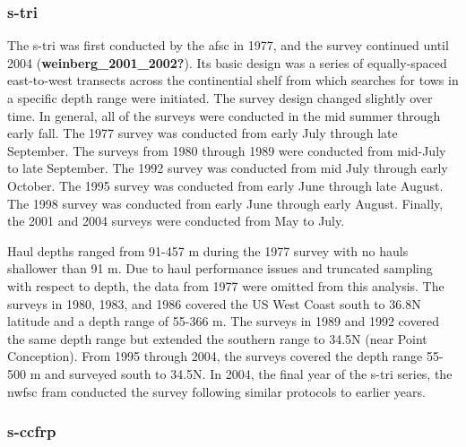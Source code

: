 \documentclass[11pt,
  english,
  a4paper,
]{article}
\begin{document}

\hypertarget{section-1}{%
\subsubsection{\texorpdfstring{\acrlong{s-tri}}{}}\label{section-1}}

\leavevmode\tagmcend\tagstructend

The \gls{s-tri} was first conducted by the \gls{afsc} in 1977, and the survey continued until 2004 {(\textbf{weinberg\_2001\_2002?})\leavevmode\tagmcend\tagstructend}. Its basic design was a series of equally-spaced east-to-west transects across the continential shelf from which searches for tows in a specific depth range were initiated. The survey design changed slightly over time. In general, all of the surveys were conducted in the mid summer through early fall. The 1977 survey was conducted from early July through late September. The surveys from 1980 through 1989 were conducted from mid-July to late September. The 1992 survey was conducted from mid July through early October. The 1995 survey was conducted from early June through late August. The 1998 survey was conducted from early June through early August. Finally, the 2001 and 2004 surveys were conducted from May to July.

Haul depths ranged from 91-457 m during the 1977 survey with no hauls shallower than 91 m. Due to haul performance issues and truncated sampling with respect to depth, the data from 1977 were omitted from this analysis. The surveys in 1980, 1983, and 1986 covered the US West Coast south to 36.8\textdegree N latitude and a depth range of 55-366 m. The surveys in 1989 and 1992 covered the same depth range but extended the southern range to 34.5\textdegree N (near Point Conception). From 1995 through 2004, the surveys covered the depth range 55-500 m and surveyed south to 34.5\textdegree N. In 2004, the final year of the \gls{s-tri} series, the \gls{nwfsc} \gls{fram} conducted the survey following similar protocols to earlier years.


\hypertarget{section-2}{%
\subsubsection{\texorpdfstring{\acrlong{s-ccfrp}}{}}\label{section-2}}
\end{document}
